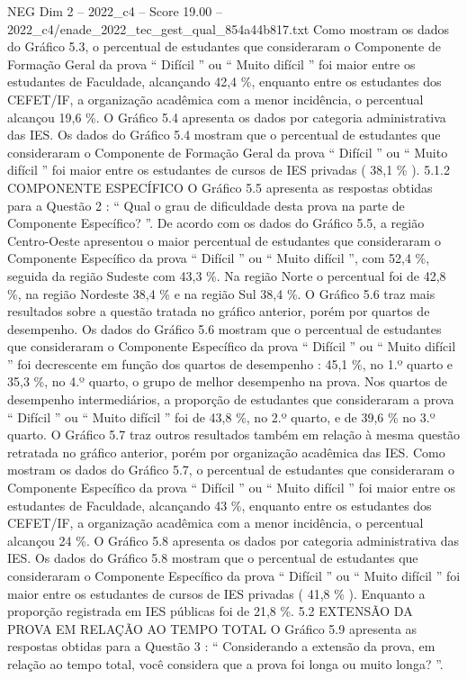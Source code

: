 \begin{textsample}{NEG Dim 2 – 2022\_c4 – Score 19.00 – 2022\_c4/enade\_2022\_tec\_gest\_qual\_854a44b817.txt}
Como mostram os dados do Gráfico 5.3, o percentual de estudantes que consideraram o Componente de Formação Geral da prova “ Difícil ” ou “ Muito difícil ” foi maior entre os estudantes de Faculdade, alcançando 42,4 \%, enquanto entre os estudantes dos CEFET/IF, a organização acadêmica com a menor incidência, o percentual alcançou 19,6 \%.
O Gráfico 5.4 apresenta os dados por categoria administrativa das IES.
Os dados do Gráfico 5.4 mostram que o percentual de estudantes que consideraram o Componente de Formação Geral da prova “ Difícil ” ou “ Muito difícil ” foi maior entre os estudantes de cursos de IES privadas ( 38,1 \% ). 5.1.2 COMPONENTE ESPECÍFICO O Gráfico 5.5 apresenta as respostas obtidas para a Questão 2 : “ Qual o grau de dificuldade desta prova na parte de Componente Específico? ”.
De acordo com os dados do Gráfico 5.5, a região Centro-Oeste apresentou o maior percentual de estudantes que consideraram o Componente Específico da prova “ Difícil ” ou “ Muito difícil ”, com 52,4 \%, seguida da região Sudeste com 43,3 \%.
Na região Norte o percentual foi de 42,8 \%, na região Nordeste 38,4 \% e na região Sul 38,4 \%.
O Gráfico 5.6 traz mais resultados sobre a questão tratada no gráfico anterior, porém por quartos de desempenho.
Os dados do Gráfico 5.6 mostram que o percentual de estudantes que consideraram o Componente Específico da prova “ Difícil ” ou “ Muito difícil ” foi decrescente em função dos quartos de desempenho : 45,1 \%, no 1.º quarto e 35,3 \%, no 4.º quarto, o grupo de melhor desempenho na prova.
Nos quartos de desempenho intermediários, a proporção de estudantes que consideraram a prova “ Difícil ” ou “ Muito difícil ” foi de 43,8 \%, no 2.º quarto, e de 39,6 \% no 3.º quarto.
O Gráfico 5.7 traz outros resultados também em relação à mesma questão retratada no gráfico anterior, porém por organização acadêmica das IES.
Como mostram os dados do Gráfico 5.7, o percentual de estudantes que consideraram o Componente Específico da prova “ Difícil ” ou “ Muito difícil ” foi maior entre os estudantes de Faculdade, alcançando 43 \%, enquanto entre os estudantes dos CEFET/IF, a organização acadêmica com a menor incidência, o percentual alcançou 24 \%.
O Gráfico 5.8 apresenta os dados por categoria administrativa das IES.
Os dados do Gráfico 5.8 mostram que o percentual de estudantes que consideraram o Componente Específico da prova “ Difícil ” ou “ Muito difícil ” foi maior entre os estudantes de cursos de IES privadas ( 41,8 \% ).
Enquanto a proporção registrada em IES públicas foi de 21,8 \%. 5.2 EXTENSÃO DA PROVA EM RELAÇÃO AO TEMPO TOTAL O Gráfico 5.9 apresenta as respostas obtidas para a Questão 3 : “ Considerando a extensão da prova, em relação ao tempo total, você considera que a prova foi longa ou muito longa? ”.

\end{textsample}

